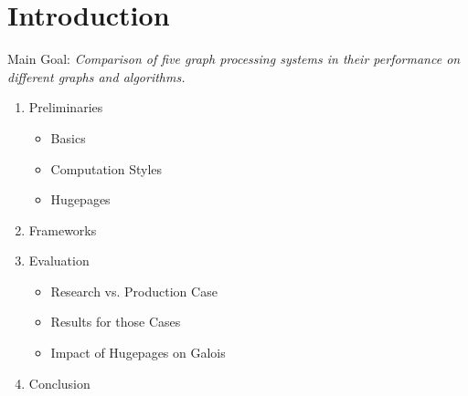 \documentclass{meetings}
\author{S. König, L. Matzner, F. Rollbühler and J. Schmid}
\date{Tuesday, 20\textsuperscript{th} October 2020}
\begin{document}
\section{Introduction}
\begin{center}
	\begin{minipage}{0.6\linewidth}
		\centering
		Main Goal: \itshape  Comparison of five graph processing systems in their performance on different graphs and algorithms.
	\end{minipage}
\end{center}



\begin{enumerate}
	\item Preliminaries
	\begin{itemize}
	\item Basics
	\item Computation Styles
	\item Hugepages
	\end{itemize}
	\item Frameworks
	\item Evaluation
	\begin{itemize}
	\item Research vs. Production Case
	\item Results for those Cases
	\item Impact of Hugepages on Galois
	\end{itemize}
	\item Conclusion
\end{enumerate}






\clearpage
\end{document}
